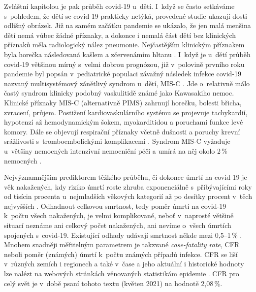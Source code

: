 Zvláštní kapitolou je pak průběh covid-19 u~dětí. I~když se často setkáváme s~pohledem, že dětí se covid-19 prakticky netýká, provedené studie ukazují dosti odlišný obrázek. Již na samém začátku pandemie se ukázalo, že jen malá menšina dětí nemá vůbec žádné příznaky, a dokonce i nemalá část dětí bez klinických příznaků měla radiologický nález pneumonie. Nejčastějším klinickým příznakem byla horečka následovaná kašlem a zčervenámím hltanu \cite{Lu:2020b}. I~když je u~dětí průběh covid-19 většinou mírný s~velmi dobrou prognózou, již v~polovině prvního roku pandemie byl popsán v~pediatrické populaci závažný následek infekce covid-19 nazvaný multisystémový zánětlivý syndrom u~dětí, MIS-C \cite{Feldstein:2020}. Jde o~relativně málo častý syndrom klinicky podobný vaskulitidě známé jako Kawasakiho nemoc. Klinické příznaky MIS-C (alternativně PIMS) zahrnují horečku, bolesti břicha, zvracení, průjem. Postižení kardiovaskulárního systému se projevuje tachykardií, hypotenzí až hemodynamickým šokem, myokarditidou a poruchami funkce levé komory. Dále se objevují respirační příznaky včetně dušnosti a poruchy krevní srážlivosti s~tromboembolickými komplikacemi \cite{Hoste:2021}. Syndrom MIS-C vyžaduje u~většiny nemocných intenzivní nemocniční péči a umírá na něj okolo 2\,\% nemocných \cite{Hoste:2021}.

Nejvýznamnějším prediktorem těžkého průběhu, či dokonce úmrtí na covid-19 je věk nakažených, kdy riziko úmrtí roste zhruba exponenciálně s~přibývajícími roky od tisícin procenta u~nejmladších věkových kategorií až po desítky procent v~těch nejvyšších \cite{ODriscoll:2020}. Odhadnout celkovou smrtnost, tedy poměr úmrtí na covid-19 k~počtu všech nakažených, je velmi komplikované, neboť v~naprosté většině situací neznáme ani celkový počet nakažených, ani nevíme o~všech úmrtích spojených s~covid-19. Existující odhady udávají smrtnost někde mezi 0,5--1\,\% \cite{Meyerowitz-Katz:2020}. Mnohem snadněji měřitelným parametrem je takzvané \textit{case-fatality rate}, CFR neboli poměr (známých) úmrtí k~počtu známých případů infekce. CFR se liší v~různých zemích i regionech a také v~čase a jeho aktuální i historické hodnoty lze nalézt na webových stránkách věnovaných statistikám epidemie \cite{owidcoronavirus}. CFR pro celý svět je v~době psaní tohoto textu (květen 2021) na hodnotě 2,08\,\%.

